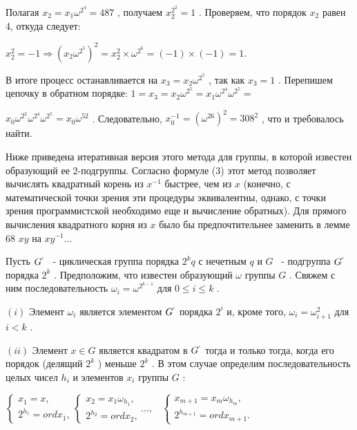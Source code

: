 \documentclass{mai_book}
\begin{document}
Полагая $x_2=x_1\omega^{2^4}=487$
, получаем $x_2^{2^2}=1$
. Проверяем, что порядок $x_2$
 равен 4, откуда следует:

\begin{center}
$x_2^2 = -1\Rightarrow (x_2\omega^{2^5})^2 = x_2^2\times\omega^{2^6}=(-1)\times(-1)=1$.
\end{center}


В итоге процесс останавливается на $x_3=x_2\omega^{2^5}$
, так как $x_3=1$
. Перепишем цепочку в обратном порядке: $1=x_3=x_2\omega^{2^5}=x_1\omega^{2^4}\omega^{2^5}=$


\newpage

$x_0\omega^{2^2}\omega^{2^4}\omega^{2^5}=x_0\omega^52$
. Следовательно, $x_0^{-1}=(\omega^26)^2=308^2$
, что и требовалось найти.

Ниже приведена итеративная версия этого метода для группы, в которой известен образующий ее 2-подгруппы. Согласно формуле (3) этот метод позволяет вычислять квадратный корень из $x^{-1}$
 быстрее, чем из $x$
 (конечно, с математической точки зрения эти процедуры эквивалентны, однако, с точки зрения программистской необходимо еще и вычисление обратных). Для прямого вычисления квадратного корня из $x$
 было бы предпочтительнее заменить в лемме 68 $xy$
 на $xy^{-1}\dots$

\begin{predl}
Пусть $G^`$
 ~- циклическая группа порядка $2^kq$
 с нечетным $q$
 и $G$
 ~- подгруппа $G^`$
 порядка $2^k$
 . Предположим, что известен образующий $\omega$
 группы $G$
 . Свяжем с ним последовательность $\omega_i=\omega^{2^{k-1}}$
 для $0\leqslant i\leqslant k$
 .

$(i)$ Элемент $\omega_i$
 является элементом $G^`$
 порядка $2^i$
 и, кроме того, $\omega_i = \omega^2_{i+1}$
 для $i<k$
 .

$(ii)$ Элемент $x\in G$
 является квадратом в $G^`$
 тогда и только тогда, когда его порядок (делящий $2^k$
    ) меньше $2^k$
 . В этом случае определим последовательность целых чисел $h_i$
 и элементов $x_i$
 группы $G$
 :
\end{predl}
\begin{center}
$
    \begin{cases}
    \text{$x_1=x$,} \\
    \text{$2^{h_1}=ordx_1$,}
    \end{cases}
    \begin{cases}
    \text{$x_2=x_1\omega_{h_1}$,} \\
    \text{$2^{h_2}=ordx_2$,}
    \end{cases}
    \dots, \ \ \ \
    \begin{cases}
    \text{$x_{m+1}=x_m\omega_{h_m}$,} \\
    \text{$2^{h_{m+1}}=ordx_{m+1}$.}
    \end{cases}
$
\end{center}
\end{document}

